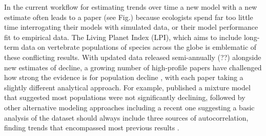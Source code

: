 \documentclass[11pt]{article}
\begin{document}
\begin{tcolorbox}
{\begin{multicols}{2}
In the current workflow for estimating trends over time a new model with a new estimate often leads to a paper (see Fig.) because ecologists spend far too little time interrogating their models with simulated data, or their model performance fit to empirical data. 
The Living Planet Index (LPI), which aims to include long-term data on vertebrate populations of species across the globe is emblematic of these conflicting results. %
With updated data released semi-annually (??) alongside new estimates of decline, a growing number of high-profile papers have challenged how strong the evidence is for population decline \citep{Dornelas2014,gonzalez2016estimating,wagner2021insect,muller2024weather}, with each paper taking a slightly different analytical approach. For example, \citet{Leung2020} published a mixture model that suggested most populations were not significantly declining, followed by other alternative modeling approaches \citep{Buschke2021,puurtinen2022living} including a recent one suggesting a basic analysis of the dataset should always include three sources of autocorrelation, finding trends that encompassed most previous results \citep{Johnson2024}. 

\end{multicols}}
\end{tcolorbox}
\end{document}
